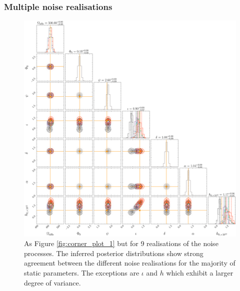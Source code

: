 \documentclass[fleqn,usenatbib,useAMS]{mnras}
\begin{document}
\subsubsection{Multiple noise realisations} \label{sec:multiple_noise}
\begin{figure}
	\includegraphics[width=\textwidth, height =\textwidth]{images/stacked_GW_plot_1000}
	\caption{As Figure \ref{fig:corner_plot_1} but for 9 realisations of the noise processes. The inferred posterior distributions show strong agreement between the different noise realisations for the majority of static parameters. The exceptions are $\iota$ and $h$ which exhibit a larger degree of variance.} 
	\label{fig:corner_plot_2}
\end{figure}
\end{document}
